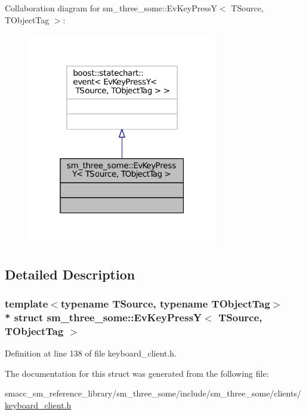 Collaboration diagram for sm\+\_\+three\+\_\+some\+:\+:Ev\+Key\+PressY$<$ T\+Source, T\+Object\+Tag $>$\+:
\nopagebreak
\begin{figure}[H]
\begin{center}
\leavevmode
\includegraphics[width=235pt]{structsm__three__some_1_1EvKeyPressY__coll__graph}
\end{center}
\end{figure}


\subsection{Detailed Description}
\subsubsection*{template$<$typename T\+Source, typename T\+Object\+Tag$>$\\*
struct sm\+\_\+three\+\_\+some\+::\+Ev\+Key\+Press\+Y$<$ T\+Source, T\+Object\+Tag $>$}



Definition at line 138 of file keyboard\+\_\+client.\+h.



The documentation for this struct was generated from the following file\+:\begin{DoxyCompactItemize}
\item 
smacc\+\_\+sm\+\_\+reference\+\_\+library/sm\+\_\+three\+\_\+some/include/sm\+\_\+three\+\_\+some/clients/\hyperlink{keyboard__client_8h}{keyboard\+\_\+client.\+h}\end{DoxyCompactItemize}
